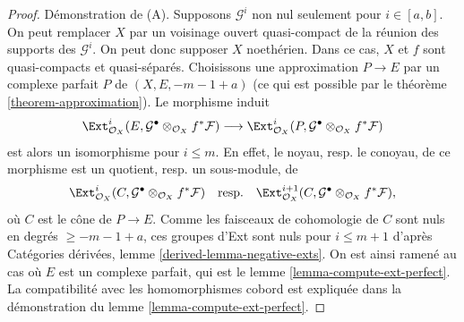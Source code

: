 \begin{proof}
D\'emonstration de (A). Supposons $\mathcal{G}^i$ non nul seulement pour
$i\in[a,b]$. On peut remplacer $X$ par un voisinage ouvert quasi-compact de la
r\'eunion des supports des $\mathcal{G}^i$. On peut donc supposer $X$
noeth\'erien. Dans ce cas, $X$ et $f$ sont quasi-compacts et quasi-s\'epar\'es.
Choisissons une approximation $P\to E$ par un complexe parfait $P$ de
$(X,E,-m-1+a)$ (ce qui est possible par le th\'eor\`eme
\ref{theorem-approximation}). Le morphisme induit
$$
\Ext^i_{\mathcal{O}_X}(E,
\mathcal{G}^\bullet \otimes_{\mathcal{O}_X} f^*\mathcal{F})
\longrightarrow
\Ext^i_{\mathcal{O}_X}(P,
\mathcal{G}^\bullet \otimes_{\mathcal{O}_X} f^*\mathcal{F})
$$
est alors un isomorphisme pour $i\leq m$. En effet, le noyau, resp. le
conoyau, de ce morphisme est un quotient, resp. un sous-module, de
$$
\Ext^i_{\mathcal{O}_X}(C,
\mathcal{G}^\bullet \otimes_{\mathcal{O}_X} f^*\mathcal{F})
\quad\text{resp.}\quad
\Ext^{i + 1}_{\mathcal{O}_X}(C,
\mathcal{G}^\bullet \otimes_{\mathcal{O}_X} f^*\mathcal{F}),
$$
o\`u $C$ est le c\^one de $P\to E$. Comme les faisceaux de cohomologie de $C$
sont nuls en degr\'es $\geq-m-1+a$, ces groupes d'Ext sont nuls pour
$i\leq m+1$ d'apr\`es Cat\'egories d\'eriv\'ees, lemme
\ref{derived-lemma-negative-exts}. On est ainsi ramen\'e au cas o\`u $E$ est un
complexe parfait, qui est le lemme \ref{lemma-compute-ext-perfect}.
La compatibilit\'e avec les homomorphismes cobord est expliqu\'ee dans la
d\'emonstration du lemme \ref{lemma-compute-ext-perfect}.


\end{proof}
